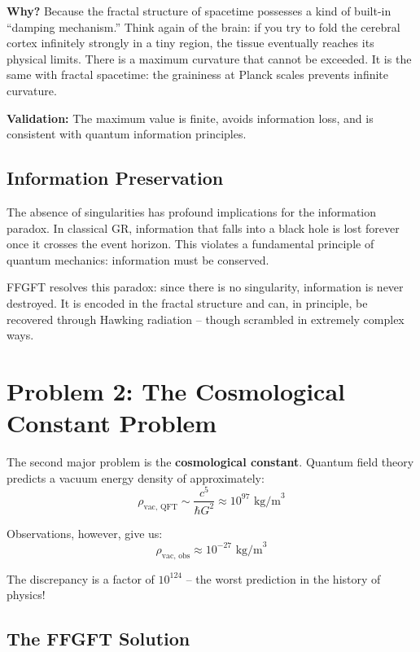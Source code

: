 \textbf{Why?} Because the fractal structure of spacetime possesses a kind of built-in ``damping mechanism.'' Think again of the brain: if you try to fold the cerebral cortex infinitely strongly in a tiny region, the tissue eventually reaches its physical limits. There is a maximum curvature that cannot be exceeded. It is the same with fractal spacetime: the graininess at Planck scales prevents infinite curvature.

\textbf{Validation:} The maximum value is finite, avoids information loss, and is consistent with quantum information principles.

\subsection{Information Preservation}

The absence of singularities has profound implications for the information paradox. In classical GR, information that falls into a black hole is lost forever once it crosses the event horizon. This violates a fundamental principle of quantum mechanics: information must be conserved.

FFGFT resolves this paradox: since there is no singularity, information is never destroyed. It is encoded in the fractal structure and can, in principle, be recovered through Hawking radiation -- though scrambled in extremely complex ways.

\section{Problem 2: The Cosmological Constant Problem}

The second major problem is the \textbf{cosmological constant}. Quantum field theory predicts a vacuum energy density of approximately:
\begin{equation}
\rho_{\text{vac, QFT}} \sim \frac{c^5}{\hbar G^2} \approx 10^{97} \text{ kg/m}^3
\end{equation}

Observations, however, give us:
\begin{equation}
\rho_{\text{vac, obs}} \approx 10^{-27} \text{ kg/m}^3
\end{equation}

The discrepancy is a factor of $10^{124}$ -- the worst prediction in the history of physics!

\subsection{The FFGFT Solution}

